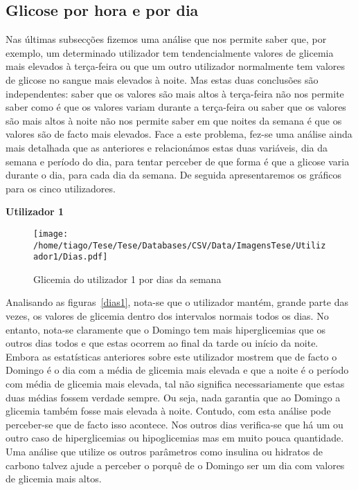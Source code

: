 \subsection{Glicose por hora e por dia}

Nas últimas subsecções fizemos uma análise que nos permite saber que, por exemplo, um determinado utilizador tem tendencialmente valores de glicemia mais elevados à terça-feira ou que um outro utilizador normalmente tem valores de glicose no sangue mais elevados à noite. Mas estas duas conclusões são independentes: saber que os valores são mais altos à terça-feira não nos permite saber como é que os valores variam durante a terça-feira ou saber que os valores são mais altos à noite não nos permite saber em que noites da semana é que os valores são de facto mais elevados. Face a este problema, fez-se uma análise ainda mais detalhada que as anteriores e relacionámos estas duas variáveis, dia da semana e período do dia, para tentar perceber de que forma é que a glicose varia durante o dia, para cada dia da semana. De seguida apresentaremos os gráficos para os cinco utilizadores. 

\textbf{Utilizador 1}

\begin{figure}[H]
\centering
\texttt{[image: /home/tiago/Tese/Tese/Databases/CSV/Data/ImagensTese/Utilizador1/Dias.pdf]}
\caption{Glicemia do utilizador 1 por dias da semana}
\label{fig:dias1}
\end{figure}
Analisando as figuras~\ref{dias1}, nota-se que o utilizador mantém, grande parte das vezes, os valores de glicemia dentro dos intervalos normais todos os dias. No entanto, nota-se claramente que o Domingo tem mais hiperglicemias que os outros dias todos e que estas ocorrem ao final da tarde ou início da noite. Embora as estatísticas anteriores sobre este utilizador mostrem que de facto o Domingo é o dia com a média de glicemia mais elevada e que a noite é o período com média de glicemia mais elevada, tal não significa necessariamente que estas duas médias fossem verdade sempre. Ou seja, nada garantia que ao Domingo a glicemia também fosse mais elevada à noite. Contudo, com esta análise pode perceber-se que de facto isso acontece. Nos outros dias verifica-se que há um ou outro caso de hiperglicemias ou hipoglicemias mas em muito pouca quantidade. Uma análise que utilize os outros parâmetros como insulina ou hidratos de carbono talvez ajude a perceber o porquê de o Domingo ser um dia com valores de glicemia mais altos. 

